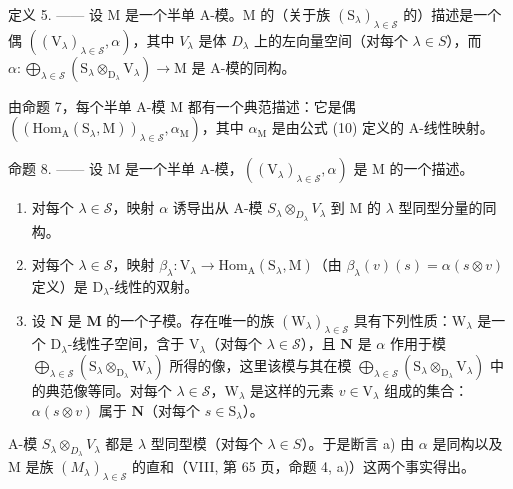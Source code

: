 定义 5. —— 设 M 是一个半单 A-模。M 的（关于族 \((\mathrm{S}_{\lambda})_{\lambda\in\mathcal{S}}\) 的）描述是一个偶 \(((\mathrm{V}_{\lambda})_{\lambda\in\mathcal{S}},\alpha)\)，其中 \(V_{\lambda}\) 是体 \(D_{\lambda}\) 上的左向量空间（对每个 \(\lambda\in S\)），而 \(\alpha:\bigoplus_{\lambda\in\mathcal{S}}(\mathrm{S}_{\lambda}\otimes_{\mathrm{D}_{\lambda}}\mathrm{V}_{\lambda})\to\mathrm{M}\) 是 A-模的同构。

由命题 7，每个半单 A-模 M 都有一个典范描述：它是偶 \(\left(\left(\mathrm{Hom}_{\mathrm{A}}\left(\mathrm{S}_{\lambda},\mathrm{M}\right)\right)_{\lambda \in \mathcal{S}},\alpha_{\mathrm{M}}\right)\)，其中 \(\alpha_{\mathrm{M}}\) 是由公式 (10) 定义的 A-线性映射。

命题 8. —— 设 M 是一个半单 A-模，\(((\mathrm{V}_{\lambda})_{\lambda \in \mathcal{S}}, \alpha)\) 是 M 的一个描述。

\begin{enumerate}
\def\labelenumi{\alph{enumi})}
\item
  对每个 \(\lambda \in \mathcal{S}\)，映射 \(\alpha\) 诱导出从 A-模 \(S_{\lambda} \otimes_{D_{\lambda}} V_{\lambda}\) 到 M 的 \(\lambda\) 型同型分量的同构。
\item
  对每个 \(\lambda \in \mathcal{S}\)，映射 \(\beta_{\lambda} : \mathrm{V}_{\lambda} \to \mathrm{Hom}_{\mathrm{A}}(\mathrm{S}_{\lambda}, \mathrm{M})\)（由 \(\beta_{\lambda}(v)(s) = \alpha(s \otimes v)\) 定义）是 \(\mathrm{D}_{\lambda}\)-线性的双射。
\item
  设 \(\mathbf{N}\) 是 \(\mathbf{M}\) 的一个子模。存在唯一的族 \((\mathrm{W}_{\lambda})_{\lambda \in \mathcal{S}}\) 具有下列性质：\(\mathrm{W}_{\lambda}\) 是一个 \(\mathrm{D}_{\lambda}\)-线性子空间，含于 \(\mathrm{V}_{\lambda}\)（对每个 \(\lambda \in \mathcal{S}\)），且 \(\mathbf{N}\) 是 \(\alpha\) 作用于模 \(\bigoplus_{\lambda \in \mathcal{S}} (\mathrm{S}_{\lambda} \otimes_{\mathrm{D}_{\lambda}} \mathrm{W}_{\lambda})\) 所得的像，这里该模与其在模 \(\bigoplus_{\lambda \in \mathcal{S}} (\mathrm{S}_{\lambda} \otimes_{\mathrm{D}_{\lambda}} \mathrm{V}_{\lambda})\) 中的典范像等同。对每个 \(\lambda \in \mathcal{S}\)，\(\mathrm{W}_{\lambda}\) 是这样的元素 \(v \in \mathrm{V}_{\lambda}\) 组成的集合：\(\alpha(s \otimes v)\) 属于 \(\mathbf{N}\)（对每个 \(s \in \mathrm{S}_{\lambda}\)）。
\end{enumerate}

A-模 \(S_{\lambda} \otimes_{D_{\lambda}} V_{\lambda}\) 都是 \(\lambda\) 型同型模（对每个 \(\lambda \in S\)）。于是断言 a) 由 \(\alpha\) 是同构以及 M 是族 \((M_{\lambda})_{\lambda \in \mathcal{S}}\) 的直和（VIII, 第 65 页，命题 4, a)）这两个事实得出。

